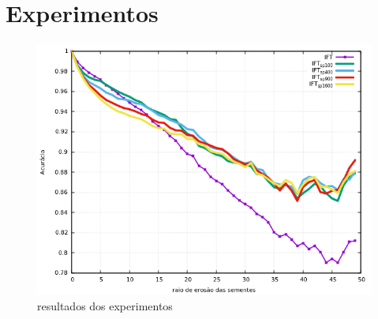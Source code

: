 \chapter{Experimentos}
\label{cap:experimentos}



\begin{figure}[!h]

\begin{center}
\includegraphics[width=14cm]{figuras/resultados}
\caption{\label{fig:resultados} resultados dos experimentos}
\end{center}
\end{figure}
